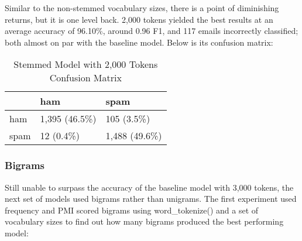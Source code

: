 \documentclass[a4paper]{article}
\begin{document}
	Similar to the non-stemmed vocabulary sizes, there is a point of diminishing returns, but it is one level back. 2,000 tokens yielded the best results at an average accuracy of 96.10\%, around 0.96 F1, and 117 emails incorrectly classified; both almost on par with the baseline model. Below is its confusion matrix:
	
	\begin{table}[H]
		\centering
		\caption{Stemmed Model with 2,000 Tokens Confusion Matrix}
		\begin{tabular}{l|ll}
			& ham & spam \\
			\hline
			ham & 1,395 (46.5\%) & 105 (3.5\%) \\
			spam & 12 (0.4\%) & 1,488 (49.6\%)
		\end{tabular}
	\end{table}

	\subsubsection{Bigrams}
	
	Still unable to surpass the accuracy of the baseline model with 3,000 tokens, the next set of models used bigrams rather than unigrams. The first experiment used frequency and PMI scored bigrams using word\_tokenize() and a set of vocabulary sizes to find out how many bigrams produced the best performing model:
	
\end{document}
